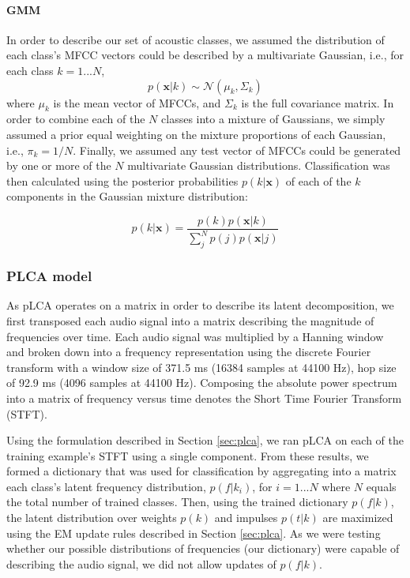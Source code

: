\paragraph{GMM}

In order to describe our set of acoustic classes, we assumed the distribution of each class's MFCC vectors could be described by a multivariate Gaussian, i.e., for each class $k = {1...N}$, 
\begin{equation}
p(\mathbf{x}|k) \sim \mathcal{N}(\mu_{k}, \Sigma_{k})  
\end{equation}
where $\mu_{k}$ is the mean vector of MFCCs, and $\Sigma_{k}$ is the full covariance matrix.  In order to combine each of the $N$ classes into a mixture of Gaussians, we simply assumed a prior equal weighting on the mixture proportions of each Gaussian, i.e., $\pi_{k} = 1 / N$.  Finally, we assumed any test vector of MFCCs could be generated by one or more of the $N$ multivariate Gaussian distributions.  Classification was then calculated using the posterior probabilities $p(k|\mathbf{x})$ of each of the $k$ components in the Gaussian mixture distribution:

\begin{equation}
p(k|\mathbf{x}) = \frac{p(k)p(\mathbf{x}|k)}{\sum_{j}^{N}p(j)p(\mathbf{x}|j)}  
\end{equation}

\subsubsection{PLCA model}

As pLCA operates on a matrix in order to describe its latent decomposition, we first transposed each audio signal into a matrix describing the magnitude of frequencies over time.  Each audio signal was multiplied by a Hanning window and broken down into a frequency representation using the discrete Fourier transform with a window size of 371.5 ms (16384 samples at 44100 Hz), hop size of 92.9 ms (4096 samples at 44100 Hz).  Composing the absolute power spectrum into a matrix of frequency versus time denotes the Short Time Fourier Transform (STFT).

Using the formulation described in Section \ref{sec:plca}, we ran pLCA on each of the training example's STFT using a single component.  From these results, we formed a dictionary that was used for classification by aggregating into a matrix each class's latent frequency distribution, $p(f|k_i)$, for $i = {1...N}$ where $N$ equals the total number of trained classes.  Then, using the trained dictionary $p(f|k)$, the latent distribution over weights $p(k)$ and impulses $p(t|k)$ are maximized using the EM update rules described in Section \ref{sec:plca}.  As we were testing whether our possible distributions of frequencies (our dictionary) were capable of describing the audio signal, we did not allow updates of $p(f|k)$.

